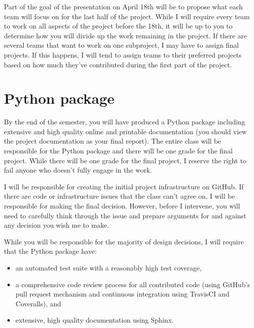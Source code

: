 \documentclass[11pt, oneside]{article}   	%
\begin{document}
Part of the goal of the presentation on April 18th will be to propose what each
team will focus on for the last half of the project.  While I will require
every team to work on all aspects of the project before the 18th, it will be up
to you to determine how you will divide up the work remaining in the project.
If there are several teams that want to work on one subproject, I may have to
assign final projects.  If this happens, I will tend to assign teams to their
preferred projects based on how much they've contributed during the first part
of the project.


\section{Python package}

By the end of the semester, you will have produced a Python package including
extensive and high quality online and printable documentation (you should view
the project documentation as your final report).  The entire class will be
responsible for the Python package and there will be one grade for the final
project.  While there will be one grade for the final project, I reserve the
right to fail anyone who doesn't fully engage in the work.

I will be responsible for creating the initial project infrastructure on
GitHub.  If there are code or infrastructure issues that the class can't agree
on, I will be responsible for making the final decision.  However, before I
intervene, you will need to carefully think through the issue and prepare
arguments for and against any decision you wish me to make.

While you will be responsible for the majority of design decisions, I will
require that the Python package have:

\begin{itemize}
\item an automated test suite with a reasonably high test coverage,
\item a comprehensive code review process for all contributed code (using
   GitHub's pull request mechanism and continuous integration using
   TravisCI and Coveralls), and
\item extensive, high quality documentation using Sphinx.
\end{itemize}
\end{document}

